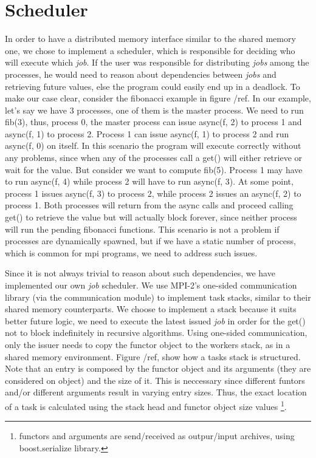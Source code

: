 \section{Scheduler}
In order to have a distributed memory interface similar to the shared memory one, we chose to implement 
a scheduler, which is responsible for deciding who will execute which \emph{job}.  If the user was 
responsible for distributing \emph{jobs} among the processes,  he would need to reason about dependencies
between \emph{jobs} and retrieving future values, else the program could easily end up in a deadlock.
To make our case clear, consider the fibonacci example in figure /ref.  In our example, let's say we have
3 processes, one of them is the master process.  We need to run fib(3), thus, process 0, the master process 
can issue async(f, 2) to process 1 and async(f, 1) to process 2.  Process 1 can issue async(f, 1) to 
process 2 and run async(f, 0) on itself.  In this scenario the program will execute correctly without any
problems, since when any of the processes call a get() will either retrieve or wait for the value.  But 
consider we want to compute fib(5).  Process 1 may have to run async(f, 4) while process 2 will have to run
async(f, 3).  At some point, process 1 issues async(f, 3) to process 2, while process 2 issues an async(f, 2)
to process 1.  Both processes will return from the async calls and proceed calling get() to retrieve the value
but will actually block forever, since neither process will run the pending fibonacci functions.  This scenario
is not a problem if processes are dynamically spawned, but if we have a static number of process, which is
common for mpi programs, we need to address such issues.  


Since it is not always trivial to reason about such dependencies, we have implemented our own \emph{job} 
scheduler.  We use MPI-2's one-sided communication library (via the communication module) to implement task
stacks, similar to their shared memory counterparts. We choose to implement a stack because it suits better
future logic, we need to execute the latest issued \emph{job} in order for the get() not to block indefinitely
in recursive algorithms.  Using one-sided communication, only the issuer needs to copy the functor object to
the workers stack, as in a shared memory environment.  Figure /ref, show how a tasks stack is structured.  
Note that an entry is composed by the functor object and its arguments (they are considered on object) and the 
size of it. This is neccessary since different funtors and/or different arguments result in varying entry sizes.
Thus, the exact location of a task is calculated using the stack head and functor object size values \footnote{
functors and arguments are send/received as outpur/input archives, using boost.serialize library.}.


